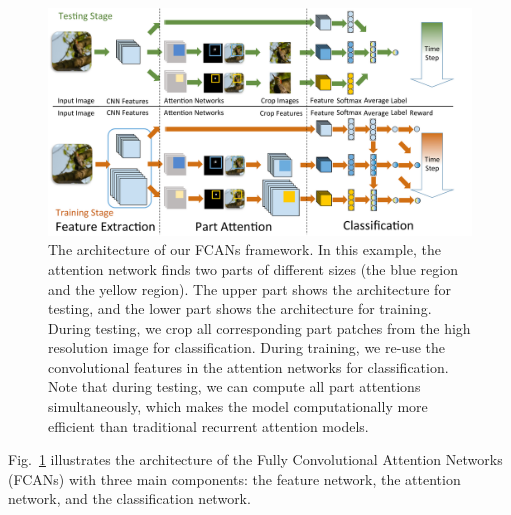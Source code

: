 \documentclass[10pt,twocolumn,letterpaper]{article}
\begin{document}
\begin{figure}[t]
\begin{center}
\includegraphics[width=\linewidth]{figs/1-cropped.pdf}
\end{center}
\caption{The architecture of our FCANs framework.
In this example, the attention network finds two parts of different sizes (the blue region and the yellow region).
The upper part shows the architecture for testing, and the lower part shows the architecture for training.
During testing, we crop all corresponding part patches from the high resolution image for classification.
During training, we re-use the convolutional features in the attention networks for classification.
Note that during testing, we can compute all part attentions simultaneously, which makes the model computationally more efficient than traditional recurrent attention models.
}
\label{fig:architecture}
\vspace{-8pt}
\end{figure}

Fig.~\ref{fig:architecture} illustrates the architecture of the Fully Convolutional Attention Networks (FCANs) with three main components: the feature network, the attention network, and the classification network.
\end{document}
